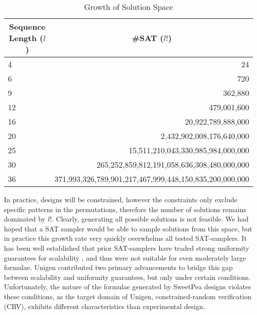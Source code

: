 \begin{table}[htb]
  \centering
  \caption{Growth of Solution Space}
\begin{tabular}{|l|r|}
\hline
\multicolumn{1}{|c|}{\textbf{Sequence Length ($l$)}} & \multicolumn{1}{c|}{\textbf{\#SAT ($l!$)}}              \\ \hline
4                                                    & 24                                                      \\ \hline
6                                                    & 720                                                     \\ \hline
9                                                    & 362,880                                                 \\ \hline
12                                                   & 479,001,600                                             \\ \hline
16                                                   & 20,922,789,888,000                                      \\ \hline
20                                                   & 2,432,902,008,176,640,000                               \\ \hline
25                                                   & 15,511,210,043,330,985,984,000,000                      \\ \hline
30                                                   & 265,252,859,812,191,058,636,308,480,000,000             \\ \hline
36                                                   & 371,993,326,789,901,217,467,999,448,150,835,200,000,000 \\ \hline
\end{tabular}
\label{tab:factorial_explosion}
\end{table}

In practice, designs will be constrained, however the constraints only exclude specific patterns in the permutations, therefore the number of solutions remains dominated by $l!$. Clearly, generating all possible solutions is not feasible. We had hoped that a SAT sampler would be able to sample solutions from this space, but in practice this growth rate very quickly overwhelms all tested SAT-samplers. It has been well established that prior SAT-samplers have traded strong uniformity guarantees for scalability \cite{chakraborty_balancing_2014}, and thus were not suitable for even moderately large formulae. Unigen \cite{chakraborty_balancing_2014} contributed two primary advancements to bridge this gap between scalability and uniformity guarantees, but only under certain conditions. Unfortunately, the nature of the formulae generated by SweetPea designs violates these conditions, as the target domain of Unigen, constrained-random verification (CRV), exhibits different characteristics than experimental design.
